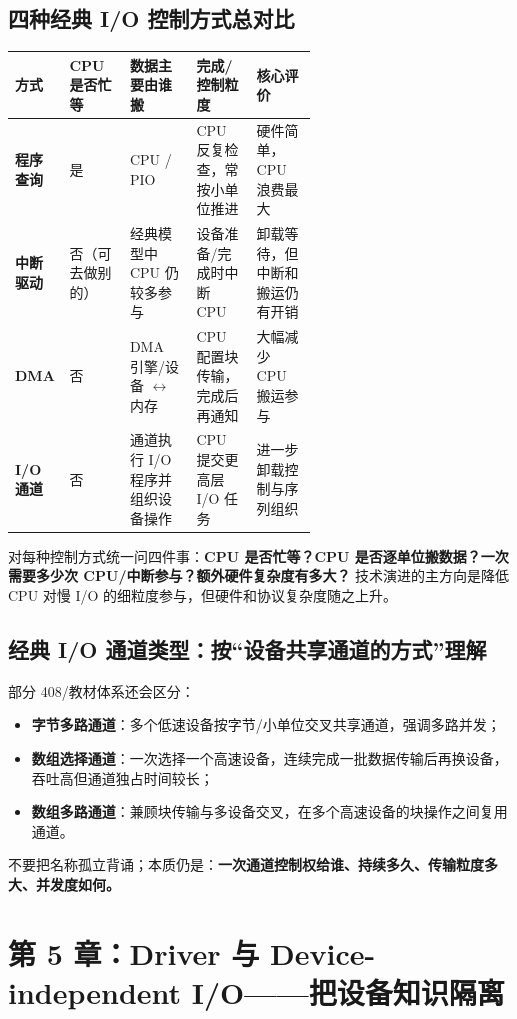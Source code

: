 \documentclass[11pt,a4paper]{ctexart}
\newcommand{\kw}[1]{\textbf{#1}}
\begin{document}
\subsection{四种经典 I/O 控制方式总对比}
\begingroup
\small
\renewcommand{\arraystretch}{1.25}
\setlength{\tabcolsep}{6pt}
\begin{tabularx}{\linewidth}{>{\bfseries}p{0.18\linewidth} p{0.2\linewidth} p{0.22\linewidth} X X}
\toprule
方式 & CPU 是否忙等 & 数据主要由谁搬 & 完成/控制粒度 & 核心评价 \\
\midrule
程序查询 & 是 & CPU / PIO & CPU 反复检查，常按小单位推进 & 硬件简单，CPU 浪费最大 \\
中断驱动 & 否（可去做别的） & 经典模型中 CPU 仍较多参与 & 设备准备/完成时中断 CPU & 卸载等待，但中断和搬运仍有开销 \\
DMA & 否 & DMA 引擎/设备 $\leftrightarrow$ 内存 & CPU 配置块传输，完成后再通知 & 大幅减少 CPU 搬运参与 \\
I/O 通道 & 否 & 通道执行 I/O 程序并组织设备操作 & CPU 提交更高层 I/O 任务 & 进一步卸载控制与序列组织 \\
\bottomrule
\end{tabularx}
\endgroup

\begin{exam}
对每种控制方式统一问四件事：\kw{CPU 是否忙等？CPU 是否逐单位搬数据？一次需要多少次 CPU/中断参与？额外硬件复杂度有多大？} 技术演进的主方向是降低 CPU 对慢 I/O 的细粒度参与，但硬件和协议复杂度随之上升。
\end{exam}

\subsection{经典 I/O 通道类型：按“设备共享通道的方式”理解}
部分 408/教材体系还会区分：
\begin{itemize}
  \item \kw{字节多路通道}：多个低速设备按字节/小单位交叉共享通道，强调多路并发；
  \item \kw{数组选择通道}：一次选择一个高速设备，连续完成一批数据传输后再换设备，吞吐高但通道独占时间较长；
  \item \kw{数组多路通道}：兼顾块传输与多设备交叉，在多个高速设备的块操作之间复用通道。
\end{itemize}
不要把名称孤立背诵；本质仍是：\kw{一次通道控制权给谁、持续多久、传输粒度多大、并发度如何。}

\section{第 5 章：Driver 与 Device-independent I/O——把设备知识隔离}
\end{document}
